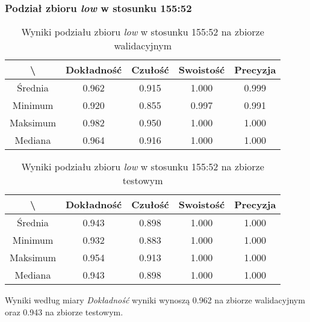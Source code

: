 \subsubsection{Podział zbioru \textit{low} w stosunku 155:52}


\begin{table}[H]
	\centering
	\caption{Wyniki podziału zbioru \textit{low} w stosunku 155:52 na zbiorze walidacyjnym}
	\vspace{6pt}
	{\footnotesize
		\begin{tabular}{|c|c|c|c|c|}
      \hline \textbackslash & Dokładność & Czułość & Swoistość & Precyzja \\
      \hline Średnia & 0.962 & 0.915 & 1.000 & 0.999 \\
      \hline Minimum & 0.920 & 0.855 & 0.997 & 0.991 \\
      \hline Maksimum & 0.982 & 0.950 & 1.000 & 1.000 \\
      \hline Mediana & 0.964 & 0.916 & 1.000 & 1.000 \\
      \hline
    \end{tabular}
    \label{Tab:lowsplitc_val}
	}
	\vspace{0pt}
\end{table}

\begin{table}[H]
	\centering
	\caption{Wyniki podziału zbioru \textit{low} w stosunku 155:52 na zbiorze testowym}
	\vspace{6pt}
	{\footnotesize
		\begin{tabular}{|c|c|c|c|c|}
      \hline \textbackslash & Dokładność & Czułość & Swoistość & Precyzja \\
      \hline Średnia & 0.943 & 0.898 & 1.000 & 1.000 \\
      \hline Minimum & 0.932 & 0.883 & 1.000 & 1.000 \\
      \hline Maksimum & 0.954 & 0.913 & 1.000 & 1.000 \\
      \hline Mediana & 0.943 & 0.898 & 1.000 & 1.000 \\
      \hline
    \end{tabular}
    \label{Tab:lowsplitc_test}
	}
	\vspace{0pt}
\end{table}

Wyniki według miary \textit{Dokładność} wyniki wynoszą 0.962 na zbiorze walidacyjnym oraz 0.943 na zbiorze testowym.
